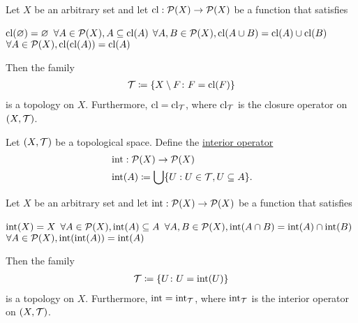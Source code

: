 \begin{proposition}\label{thm:closure_operator_axioms}\cite[10]{Exercises:general_topology}
  Let $X$ be an arbitrary set and let $\operatorname{cl}: \operatorname{\mathcal P}(X) \to \operatorname{\mathcal P}(X)$ be a function that satisfies
  \begin{description}
     $\operatorname{cl}(\varnothing) = \varnothing$
     $\forall A \in \operatorname{\mathcal P}(X), A \subseteq \operatorname{cl}(A)$
     $\forall A, B \in \operatorname{\mathcal P}(X), \operatorname{cl}(A \cup B) = \operatorname{cl}(A) \cup \operatorname{cl}(B)$
     $\forall A \in \operatorname{\mathcal P}(X), \operatorname{cl}(\operatorname{cl}(A)) = \operatorname{cl}(A)$
  \end{description}

  Then the family
  \begin{align*}
    \mathcal T \coloneqq \{ X \setminus F \colon F = \operatorname{cl}(F) \}
  \end{align*}
  is a topology on $X$. Furthermore, $\operatorname{cl} = \operatorname{cl}_{\mathcal T}$, where $\operatorname{cl}_{\mathcal T}$ is the closure operator on $(X, \mathcal T)$.
\end{proposition}

\begin{definition}\label{def:interior_operator}\cite[35]{Lectures:general_topology}
  Let $(X, \mathcal T)$ be a topological space. Define the \uline{interior operator}
  \begin{align*}
    &\operatorname{int}: \operatorname{\mathcal P}(X) \to \operatorname{\mathcal P}(X) \\
    &\operatorname{int}(A) \coloneqq \bigcup \{ U : U \in \mathcal T, U \subseteq A \}.
  \end{align*}
\end{definition}

\begin{proposition}\label{thm:interior_operator_axioms}
  Let $X$ be an arbitrary set and let $\operatorname{int}: \operatorname{\mathcal P}(X) \to \operatorname{\mathcal P}(X)$ be a function that satisfies
  \begin{description}
     $\operatorname{int}(X) = X$
     $\forall A \in \operatorname{\mathcal P}(X), \operatorname{int}(A) \subseteq A$
     $\forall A, B \in \operatorname{\mathcal P}(X), \operatorname{int}(A \cap B) = \operatorname{int}(A) \cap \operatorname{int}(B)$
     $\forall A \in \operatorname{\mathcal P}(X), \operatorname{int}(\operatorname{int}(A)) = \operatorname{int}(A)$
  \end{description}

  Then the family
  \begin{align*}
    \mathcal T \coloneqq \{ U \colon U = \operatorname{int}(U) \}
  \end{align*}
  is a topology on $X$. Furthermore, $\operatorname{int} = \operatorname{int}_{\mathcal T}$, where $\operatorname{int}_{\mathcal T}$ is the interior operator on $(X, \mathcal T)$.
\end{proposition}
